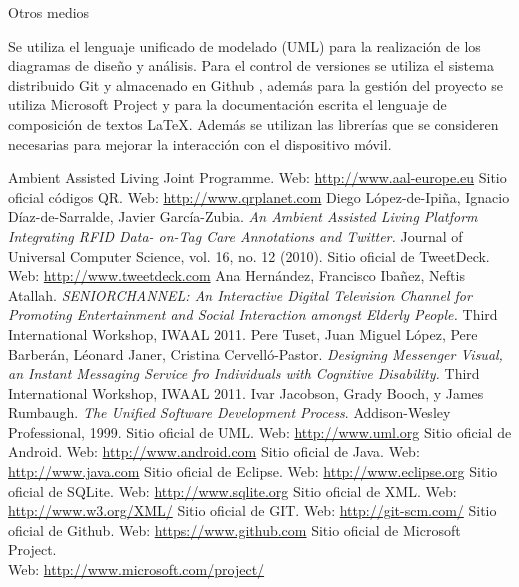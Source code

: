 \documentclass[12pt,a4paper,spanish,oneside]{report}
\makeatletter
\renewcommand{\subsection}{
  \@startsection{subsection}{2}{0mm}{2mm}
  {4.0mm}{\Large\bf}
}
\theoremstyle{plain} \newtheorem{nota}{Nota}
\makeatother
\begin{document}
\subsection{Otros medios}
\begin{spacing}{1.5}
Se utiliza el lenguaje unificado de modelado (UML) \cite{UML} para la 
realización de los diagramas de diseño y análisis. Para el control de versiones
se utiliza el sistema distribuido Git \cite{GIT}y almacenado en Github 
\cite{GITH}, además para la gestión del proyecto se utiliza Microsoft Project 
\cite{MS}  y para la documentación escrita el lenguaje de composición de textos 
\LaTeX{}. Además se utilizan las librerías que se consideren necesarias para
mejorar la interacción con el dispositivo móvil.
\end{spacing}
\begin{thebibliography}{99}
 Ambient Assisted Living Joint Programme. 
Web: \url{http://www.aal-europe.eu}
 Sitio oficial códigos QR. Web: \url{http://www.qrplanet.com}
 Diego López-de-Ipiña, Ignacio Díaz-de-Sarralde, Javier 
García-Zubia. \emph{An Ambient Assisted Living Platform Integrating RFID Data-
on-Tag Care Annotations and Twitter.} Journal of Universal Computer Science, 
vol. 16, no. 12 (2010).
 Sitio oficial de TweetDeck. Web: \url{http://www.tweetdeck.com}
 Ana Hernández, Francisco Ibañez, Neftis Atallah. 
\emph{SENIORCHANNEL: An Interactive Digital Television Channel for Promoting 
Entertainment and Social Interaction amongst Elderly People.} Third 
International Workshop, IWAAL 2011. 
 Pere Tuset, Juan Miguel López, Pere Barberán, Léonard Janer, 
Cristina Cervelló-Pastor. \emph{Designing Messenger Visual, an Instant 
Messaging Service fro Individuals with Cognitive Disability.} Third 
International Workshop, IWAAL 2011.
 Ivar Jacobson, Grady Booch, y James Rumbaugh. \emph{The Unified 
Software Development Process}. Addison-Wesley Professional, 1999.
 Sitio oficial de UML. Web: \url{http://www.uml.org}
 Sitio oficial de Android. Web: \url{http://www.android.com}
 Sitio oficial de Java. Web: \url{http://www.java.com}
 Sitio oficial de Eclipse. Web: \url{http://www.eclipse.org}
 Sitio oficial de SQLite. Web: \url{http://www.sqlite.org}
 Sitio oficial de XML. Web: \url{http://www.w3.org/XML/}
 Sitio oficial de GIT. Web: \url{http://git-scm.com/}
 Sitio oficial de Github. Web: \url{https://www.github.com}
 Sitio oficial de Microsoft Project. \\
Web: \url{http://www.microsoft.com/project/}
\end{thebibliography}
\end{document}
